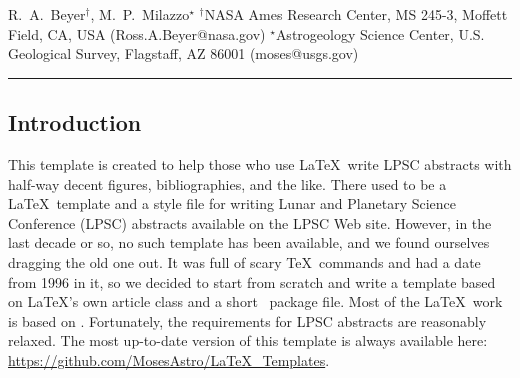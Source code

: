 \documentclass[twoside]{article}
\begin{document}

{R.~A.~Beyer$^{\dag}$, M.~P.~Milazzo$^{\star}$ $^{\dag}$NASA Ames Research Center, MS 245-3, Moffett Field, CA, USA (Ross.A.Beyer@nasa.gov) $^{\star}
$Astrogeology Science Center, U.S. Geological Survey, Flagstaff, AZ 86001 (moses@usgs.gov) \\ \hrule
} 

%

%


\balance


\subsection*{Introduction} This template is created to help those who use \LaTeX\ write LPSC abstracts with half-way decent figures, bibliographies, 
and the like.
There used to be a \LaTeX\ template and a style file for writing Lunar and Planetary Science Conference (LPSC) abstracts available
on the LPSC Web site.
However, in the last decade or so, no such template has been available, and we found ourselves dragging the old one out.
It was full of scary \TeX\ commands and had a date from 1996 in it, so we decided to start from scratch and write a template based on \LaTeX's own article class and a short \LaTeXe\ package file.  
Most of the \LaTeX\ work is based on \citep{kopka2003guide}.
Fortunately, the requirements for LPSC abstracts \citep{LPSC} are reasonably relaxed.
The most up-to-date version of this template is always available here:\\
\url{https://github.com/MosesAstro/LaTeX_Templates}.
\end{document}
